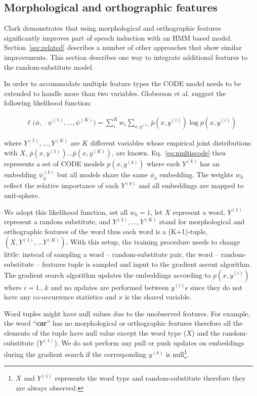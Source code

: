 \subsection{Morphological and orthographic features}
\label{sec:feat}

Clark  demonstrates that
using morphological and orthographic features significantly improves
part of speech induction with an HMM based model.
Section~\ref{sec:related} describes a number of other approaches that
show similar improvements.  This section describes one way to
integrate additional features to the random-substitute model.

In order to accommodate multiple feature types the CODE model needs to
be extended to handle more than two variables.  Globerson et
al.  suggest the following
likelihood function:

\begin{eqnarray}
&\ell(\phi,& \psi^{(1)}, \ldots, \psi^{(K)}) = \label{eq:multiscode} \sum_i^K w_i \sum_{x,y^{(i)}} \bar{p}(x,y^{(i)}) \log p(x,y^{(i)})
\end{eqnarray}

\noindent where $Y^{(1)}, \ldots, Y^{(K)}$ are $K$ different variables
whose empirical joint distributions with $X$,
$\bar{p}(x,y^{(1)})\ldots\bar{p}(x,y^{(K)})$, are known.
Eq.~\ref{eq:multiscode} then represents a set of CODE models
$p(x,y^{(k)})$ where each $Y^{(k)}$ has an embedding $\psi_y^{(k)}$
but all models share the same $\phi_x$ embedding.  The weights $w_k$
reflect the relative importance of each $Y^{(k)}$ and all embeddings
are mapped to unit-sphere.

We adopt this likelihood function, set all $w_k=1$, let $X$ represent
a word, $Y^{(1)}$ represent a random substitute, and $Y^{(2)}, \ldots,
Y^{(K)}$ stand for morphological and orthographic features of the word
thus each word is a (K+1)-tuple, $(X, Y^{(1)}, \hdots Y^{(K)})$.  With
this setup, the training procedure needs to change little: instead of
sampling a word -- random-substitute pair, the word --
random-substitute -- features tuple is sampled and input to the
gradient ascent algorithm.  The gradient search algorithm updates the
embeddings according to $p(x,y^{(i)})$ where $i=1\hdots k$ and no
updates are performed between $y^{(i)}$s since they do not have any
co-occurrence statistics and $x$ is the shared variable.

Word tuples might have null values due to the unobserved features.
For example, the word ``\textbf{car}'' has no morphological or
orthographic features therefore all the elements of the tuple have
null value except the word type ($X$) and the random-substitute
($Y^{(1)}$).  We do not perform any pull or push updates on embeddings
during the gradient search if the corresponding $y^{(k)}$ is
null\footnote{$X$ and $Y^{(1)}$ represents the word type and
  random-substitute therefore they are always observed.}.


